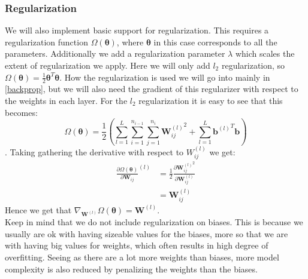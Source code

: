 \documentclass{article}
\begin{document}
\subsubsection{Regularization}
We will also implement basic support for regularization. This requires a
regularization function $\Omega(\bm{\theta})$, where $\bm{\theta}$ in this case
corresponds to all the parameters. Additionally we add a regularization parameter
$\lambda$ which scales the extent of regularization we apply. Here we will only
add $l_2$ regularization, so $\Omega(\bm{\theta}) = \frac{1}{2}\bm{\theta}^T
      \bm{\theta}$. How the regularization is used we will go into mainly in
\ref{backprop}, but we will also need the gradient of this regularizer with
respect to the weights in each layer. For the $l_2$ regularization it is easy to
see that this becomes:
$$\Omega(\bm{\theta}) = \frac{1}{2} \left( \sum_{l = 1}^{L} \sum_{i = 1}^{n_{i-1}} \sum_{j = 1}^{n_i} {\bm{W}_{i j}^{(l)}}^2 + \sum_{l = 1}^{L} {\bm{b}^{(l)}}^T \bm{b} \right)$$.
Taking gathering the derivative with respect to $W_{i j}^{(l)}$ we get:
\begin{align*}
      \frac{\partial \Omega(\bm{\theta})}{\partial \bm{W}_{i j}}^{(l)} & = \frac{1}{2} \frac{\partial {\bm{W}_{i j}^{(l)}}^2}{\partial \bm{W}_{i j}^{(l)}} \\
                                                                       & = \bm{W}_{i j}^{(l)}
\end{align*}
Hence we get that $\nabla_{\bm{W}^{(l)}} \Omega(\bm{\theta}) = \bm{W}^{(l)}$.\\
Keep in mind that we do not include regularization on biases.  This is because
we usually are ok with having sizeable values for the biases, more so that we
are with having big values for weights, which often results in high degree of
overfitting. Seeing as there are a lot more weights than biases, more model
complexity is also reduced by penalizing the weights than the biases.
\end{document}
